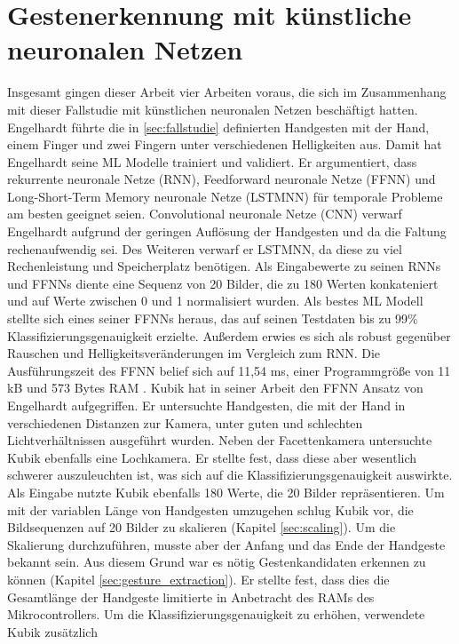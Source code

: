 \section{Gestenerkennung mit künstliche neuronalen Netzen}
Insgesamt gingen dieser Arbeit vier Arbeiten voraus, die sich im Zusammenhang mit dieser Fallstudie mit künstlichen neuronalen Netzen beschäftigt hatten.
\newline
\newline
Engelhardt führte die in \ref{sec:fallstudie} definierten Handgesten mit der Hand, einem Finger und zwei Fingern unter verschiedenen Helligkeiten aus. Damit hat Engelhardt seine ML Modelle trainiert und validiert. Er
argumentiert, dass rekurrente neuronale Netze (RNN), Feedforward neuronale Netze (FFNN) und Long-Short-Term Memory neuronale Netze (LSTMNN) für temporale Probleme am besten geeignet seien. Convolutional neuronale
Netze (CNN) verwarf Engelhardt aufgrund der geringen Auflösung der Handgesten und da die Faltung rechenaufwendig sei. Des Weiteren verwarf er LSTMNN, da diese zu viel Rechenleistung und Speicherplatz
benötigen. Als Eingabewerte zu seinen RNNs und FFNNs diente eine Sequenz von 20 Bilder, die zu 180 Werten konkateniert und auf Werte zwischen 0 und 1 normalisiert wurden. Als bestes ML Modell stellte sich eines
seiner FFNNs heraus, das auf seinen Testdaten bis zu 99\% Klassifizierungsgenauigkeit erzielte. Außerdem erwies es sich als robust gegenüber Rauschen und Helligkeitsveränderungen im Vergleich zum RNN. Die Ausführungszeit
des FFNN belief sich auf 11,54 ms, einer Programmgröße von 11 kB und 573 Bytes RAM \cite{engelhardtThesis}.
\newline
\newline
Kubik hat in seiner Arbeit den FFNN Ansatz von Engelhardt aufgegriffen. Er untersuchte Handgesten, die mit der Hand in verschiedenen Distanzen zur Kamera, unter guten und schlechten Lichtverhältnissen ausgeführt wurden.
Neben der Facettenkamera untersuchte Kubik ebenfalls eine Lochkamera. Er stellte fest, dass diese aber wesentlich schwerer auszuleuchten ist, was sich auf die
Klassifizierungsgenauigkeit auswirkte. Als Eingabe nutzte Kubik ebenfalls 180 Werte, die 20 Bilder repräsentieren. Um mit der variablen Länge von Handgesten umzugehen schlug Kubik vor, die Bildsequenzen auf 20 Bilder zu
skalieren (Kapitel \ref{sec:scaling}). Um die Skalierung durchzuführen, musste aber der Anfang und das Ende der Handgeste bekannt sein. Aus diesem Grund war es nötig Gestenkandidaten erkennen zu können (Kapitel
\ref{sec:gesture_extraction}). Er stellte fest, dass dies die Gesamtlänge der Handgeste limitierte in Anbetracht des RAMs des Mikrocontrollers. Um die Klassifizierungsgenauigkeit zu erhöhen, verwendete Kubik zusätzlich
